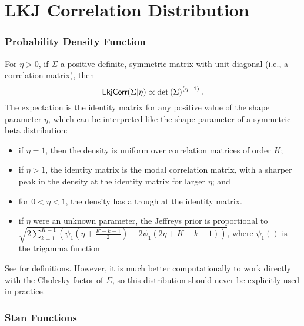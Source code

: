 \section{LKJ Correlation Distribution}\label{lkj-correlation.section}

\subsubsection{Probability Density Function}

For $\eta > 0$, if $\Sigma$ a positive-definite, symmetric matrix with
unit diagonal (i.e., a correlation matrix), then
%
\[
\mbox{\sf LkjCorr}(\Sigma|\eta)
\propto \det \left( \Sigma \right)^{(\eta - 1)}.
\]
%
The expectation is the identity matrix for any positive value of the
shape parameter $\eta$, which can be interpreted like the shape parameter
of a symmetric beta distribution:
%
\begin{itemize}
\item if $\eta = 1$, then the density is uniform over correlation
  matrices of order $K$;
\item if $\eta > 1$, the identity matrix is the modal correlation
  matrix, with a sharper peak in the density at the identity matrix
  for larger $\eta$; and
\item for $0 < \eta < 1$, the density has a trough at the identity
  matrix.
\item if $\eta$ were an unknown parameter, the Jeffreys prior is
  proportional to $\sqrt{2\sum_{k=1}^{K-1}\left(
  \psi_1\left(\eta+\frac{K-k-1}{2}\right) -
  2\psi_1\left(2\eta+K-k-1 \right)\right)}$, where $\psi_1()$ is the
  trigamma function
\end{itemize}
%
See \citep{LewandowskiKurowickaJoe:2009} for definitions. However, it
is much better computationally to work directly with the Cholesky factor
of $\Sigma$, so this distribution should never be explicitly used in
practice.


\subsubsection{Stan Functions}

\begin{description}
%
%
\end{description}
\begin{description}
\end{description}


